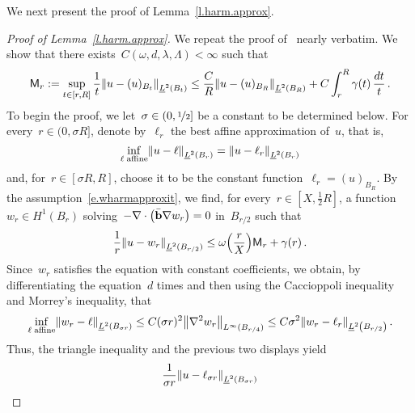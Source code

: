 \documentclass[11pt,twoside]{article} %
\numberwithin{equation}{section}
\theoremstyle{definition}
\let\originalleft\left
\let\originalright\right
\renewcommand{\left}{\mathopen{}\mathclose\bgroup\originalleft}
\renewcommand{\right}{\aftergroup\egroup\originalright}
\newcommand{\bhom}{\bar{\mathbf{b}}}
\begin{document}
We next present the proof of Lemma~\ref{l.harm.approx}.

\begin{proof}[{Proof of Lemma~\ref{l.harm.approx}}]
We repeat the proof of~\cite[Lemma 3.4]{AKMBook} nearly verbatim. We show that there exists~$C(\omega,d,\lambda,\Lambda)<\infty$ such that
\begin{equation} \label{e.harm.approx.goal}
\mathsf{M}_r 
:= 
\sup_{t \in [r,R]}  \frac 1t \left\| u- (u)_{B_t} \right\|_{\underline{L}^2 \left( B_{t} \right)} 
\leq 
\frac CR \left\| u- (u)_{B_R} \right\|_{\underline{L}^2 \left( B_{R} \right)}  
+
C \int_{ r}^{R}  \gamma(t) \, \frac{dt}{t} 
\,.
\end{equation}
To begin the proof, we let~$\sigma \in (0,\nicefrac12]$ be a constant to be determined below. For every~$r \in (0,\sigma R]$, denote by~$\ell_{r}$ the best affine approximation of~$u$, that is, 
\begin{equation*} %
\inf_{\ell  \; \mathrm{affine}} \left\| u - \ell \right\|_{\underline{L}^2(B_{r})}  = \left\| u - \ell_r \right\|_{\underline{L}^2(B_{r})}
\end{equation*}
and, for~$r \in [\sigma R,R]$, choose it to be the constant function~$\ell_r = (u)_{B_R}$. By the assumption~\eqref{e.wharmapproxit}, we find, for every~$r  \in [X, \tfrac12 R]$, a function~$w_r \in H^1(B_{r})$ solving~$-\nabla \cdot \left( \bhom \nabla w_r \right) = 0$ in~$B_{r/2}$ such that 
\begin{equation} 
\label{e.wharmapproxit.applied}
\frac1r \left\| u - w_r \right\|_{\underline{L}^2(B_{r/2})} \leq    
\omega\Bigl( \frac{r}X \Bigr) \mathsf{M}_r  + \gamma(r)
\,. 
\end{equation}
Since~$w_r$ satisfies the equation with constant coefficients, we obtain, by differentiating the equation~$d$ times and then using the Caccioppoli inequality and Morrey's inequality, that
\begin{equation*}  
\inf_{\ell  \; \mathrm{affine}}  \left\| w_r - \ell \right\|_{\underline{L}^2 \left( B_{ \sigma r} \right)} 
\leq 
C(\sigma r)^2 \left\| \nabla^2 w_r \right\|_{L^{\infty}(B_{r/4})}
\leq
C\sigma^2 \left\| w_r - \ell_{r} \right\|_{\underline{L}^2 \left( B_{r/2} \right)} 
\,.
\end{equation*}
Thus, the triangle inequality and the previous two displays yield 
\begin{equation}  
\label{e.readyforiterz}
\frac1{\sigma r}\left\| u - \ell_{\sigma r} \right\|_{\underline{L}^2 \left( B_{ \sigma r} \right)} 

\end{equation}
\end{proof}
\end{document}
